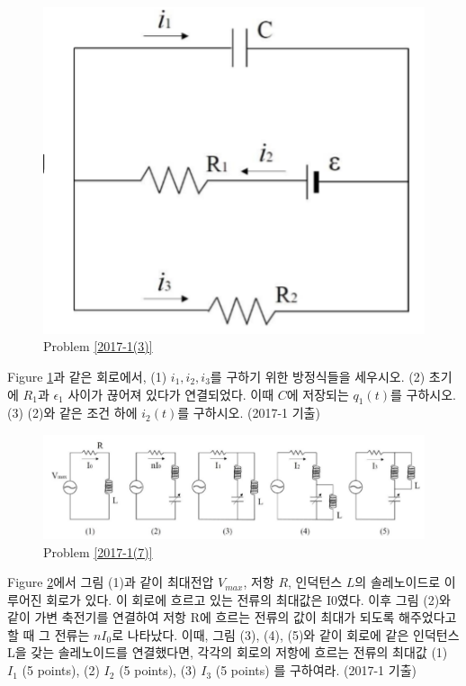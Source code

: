 \begin{problem}\label{2017-1(3)}
\begin{figure}[h]
\centering\includegraphics[scale=0.4]{Pictures/2017-1(3).png}
\caption{Problem \ref{2017-1(3)}}
\label{fig:2017-1(3)}
\end{figure}
Figure \ref{fig:2017-1(3)}과 같은 회로에서,
(1) $i_1, i_2, i_3$를 구하기 위한 방정식들을 세우시오. (2) 초기에 $R_1$과 $\epsilon_1$ 사이가 끊어져 있다가 연결되었다. 이때 $C$에 저장되는 $q_1(t)$를 구하시오. (3) (2)와 같은 조건 하에 $i_2(t)$를 구하시오.
(2017-1 기출)
\end{problem}
\begin{problem}\label{2017-1(7)}
\begin{figure}[h]
\centering\includegraphics[scale=0.7]{Pictures/2017-1(7).png}
\caption{Problem \ref{2017-1(7)}}
\label{fig:2017-1(7)}
\end{figure}
Figure \ref{fig:2017-1(7)}에서 그림 (1)과 같이 최대전압 $V_{max}$, 저항 $R$, 인덕턴스 $L$의 솔레노이드로 이루어진 회로가 있다. 이 회로에 흐르고 있는 전류의 최대값은 I0였다. 이후 그림 (2)와 같이 가변 축전기를 연결하여 저항 R에 흐르는 전류의 값이 최대가 되도록 해주었다고 할 때 그 전류는 $nI_0$로 나타났다. 이때, 그림 (3), (4), (5)와 같이 회로에 같은 인덕턴스 L을 갖는 솔레노이드를 연결했다면, 각각의 회로의 저항에 흐르는 전류의 최대값 (1) $I_1$ (5 points), (2) $I_2$ (5 points), (3) $I_3$ (5 points) 를 구하여라. 
(2017-1 기출)
\end{problem}
